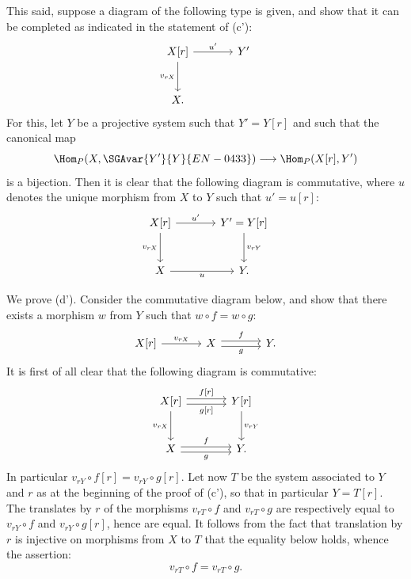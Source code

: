 \begin{prooftext}[Proof]
This said, suppose a diagram of the following type is given, and show that it can be completed as indicated in the statement of (c'):
\[
\begin{tikzcd}[column sep=large,row sep=large]
X[r] \arrow[r,"u'"] \arrow[d,"{v_{rX}}"'] & Y'\\
X .
\end{tikzcd}
\]
For this, let $Y$ be a projective system such that $Y'=Y[r]$ and such that the canonical map
\[
\Hom_P(X,\SGAvar{Y'}{Y}{EN-0433})\longrightarrow\Hom_P(X[r],Y')
\]
is a bijection. Then it is clear that the following diagram is commutative, where $u$ denotes the unique morphism from $X$ to $Y$ such that $u'=u[r]$:
\[
\begin{tikzcd}[column sep=large,row sep=large]
X[r] \arrow[r,"u'"] \arrow[d,"{v_{rX}}"'] & Y'=Y[r] \arrow[d,"{v_{rY}}"]\\
X \arrow[r,"u"'] & Y .
\end{tikzcd}
\]

We prove (d'). Consider the commutative diagram below, and show that there exists a morphism $w$ from $Y$ such that $w\circ f=w\circ g$:
\[
\begin{tikzcd}[column sep=large]
X[r] \arrow[r,"{v_{rX}}"] & X \arrow[r,shift left,"f"] \arrow[r,shift right,"g"'] & Y .
\end{tikzcd}
\]
It is first of all clear that the following diagram is commutative:
\[
\begin{tikzcd}[column sep=large,row sep=large]
X[r] \arrow[r,shift left,"{f[r]}"] \arrow[r,shift right,"{g[r]}"'] \arrow[d,"{v_{rX}}"'] & Y[r] \arrow[d,"{v_{rY}}"]\\
X \arrow[r,shift left,"f"] \arrow[r,shift right,"g"'] & Y .
\end{tikzcd}
\]
In particular $v_{rY}\circ f[r]=v_{rY}\circ g[r]$. Let now $T$ be the system associated to $Y$ and $r$ as at the beginning of the proof of (c'), so that in particular $Y=T[r]$. The translates by $r$ of the morphisms $v_{rT}\circ f$ and $v_{rT}\circ g$ are respectively equal to $v_{rY}\circ f$ and $v_{rY}\circ g[r]$, hence are equal. It follows from the fact that translation by $r$ is injective on morphisms from $X$ to $T$ that the equality below holds, whence the assertion:
\[
v_{rT}\circ f=v_{rT}\circ g.
\]
\end{prooftext}

